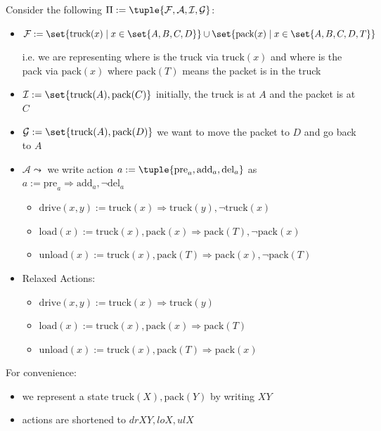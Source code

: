 \newpage
{}
Consider the following  $\Pi := \tuple{\mathcal{F}, \mathcal{A}, \mathcal{I}, \mathcal{G}}$:
\begin{itemize}
\item $\mathcal{F} := \set{\text{truck}(x) \mid x \in \set{A,B,C,D}} \cup \set{\text{pack}(x)\mid x \in \set{A,B,C,D,T}}$ 

i.e. we are representing where is the truck via $\text{truck}(x)$ and where is the pack via $\text{pack}(x)$ where $\text{pack}(T)$ means the packet is in the truck

\item $\mathcal{I} := \set{\text{truck}(A), \text{pack}(C)}$ \hfill initially, the truck is at $A$ and the packet is at $C$
\item $\mathcal{G} := \set{\text{truck}(A), \text{pack}(D)}$ \hfill we want to move the packet to $D$ and go back to $A$
\item $\mathcal{A} \leadsto$ we write action $a := \tuple{\text{pre}_a, \text{add}_a, \text{del}_a}$ as $a := \text{pre}_a \Rightarrow \text{add}_a , \neg \text{del}_a$
\begin{itemize}
    \item $\text{drive}(x,y) := \text{truck}(x) \Rightarrow \text{truck}(y) , \neg \text{truck}(x)$
    \item $\text{load}(x) := \text{truck}(x), \text{pack}(x) \Rightarrow \text{pack}(T), \neg \text{pack}(x)$
    \item $\text{unload}(x) := \text{truck}(x), \text{pack}(T) \Rightarrow \text{pack}(x), \neg \text{pack}(T)$
\end{itemize}
\item Relaxed Actions:
\begin{itemize}
    \item $\text{drive}(x,y) := \text{truck}(x) \Rightarrow \text{truck}(y)$
    \item $\text{load}(x) := \text{truck}(x), \text{pack}(x) \Rightarrow \text{pack}(T)$
    \item $\text{unload}(x) := \text{truck}(x), \text{pack}(T) \Rightarrow \text{pack}(x)$
\end{itemize}
\end{itemize}

For convenience: 
\begin{itemize}
    \item we represent a state $\text{truck}(X), \text{pack}(Y)$ by writing $XY$
    \item actions are shortened to $drXY,loX, ulX$
\end{itemize}

